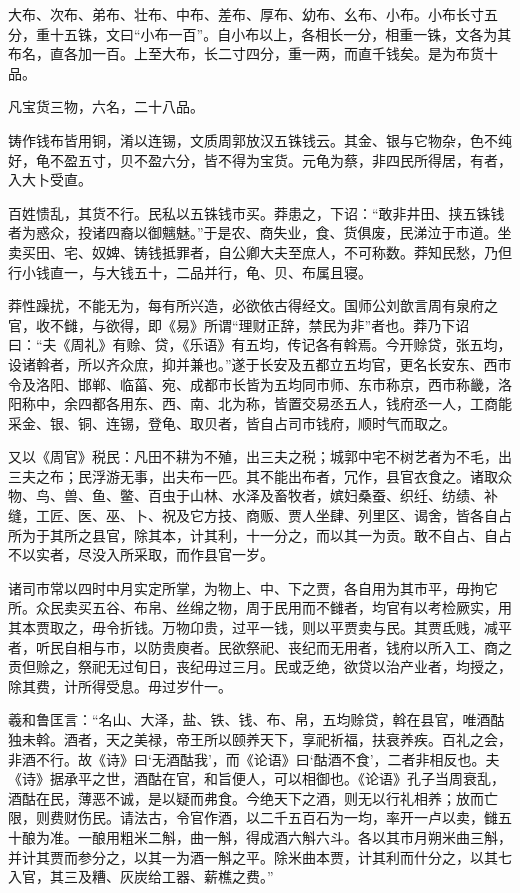 \documentclass[12pt,UTF8]{ctexbook}
\begin{document}
大布、次布、弟布、壮布、中布、差布、厚布、幼布、幺布、小布。小布长寸五分，重十五铢，文曰“小布一百”。自小布以上，各相长一分，相重一铢，文各为其布名，直各加一百。上至大布，长二寸四分，重一两，而直千钱矣。是为布货十品。



凡宝货三物，六名，二十八品。



铸作钱布皆用铜，淆以连锡，文质周郭放汉五铢钱云。其金、银与它物杂，色不纯好，龟不盈五寸，贝不盈六分，皆不得为宝货。元龟为蔡，非四民所得居，有者，入大卜受直。



百姓愦乱，其货不行。民私以五铢钱市买。莽患之，下诏：“敢非井田、挟五铢钱者为惑众，投诸四裔以御魑魅。”于是农、商失业，食、货俱废，民涕泣于市道。坐卖买田、宅、奴婢、铸钱抵罪者，自公卿大夫至庶人，不可称数。莽知民愁，乃但行小钱直一，与大钱五十，二品并行，龟、贝、布属且寝。



莽性躁扰，不能无为，每有所兴造，必欲依古得经文。国师公刘歆言周有泉府之官，收不雠，与欲得，即《易》所谓“理财正辞，禁民为非”者也。莽乃下诏曰：“夫《周礼》有赊、贷，《乐语》有五均，传记各有斡焉。今开赊贷，张五均，设诸斡者，所以齐众庶，抑并兼也。”遂于长安及五都立五均官，更名长安东、西市令及洛阳、邯郸、临菑、宛、成都市长皆为五均同市师、东市称京，西市称畿，洛阳称中，余四都各用东、西、南、北为称，皆置交易丞五人，钱府丞一人，工商能采金、银、铜、连锡，登龟、取贝者，皆自占司市钱府，顺时气而取之。



又以《周官》税民：凡田不耕为不殖，出三夫之税；城郭中宅不树艺者为不毛，出三夫之布；民浮游无事，出夫布一匹。其不能出布者，冗作，县官衣食之。诸取众物、鸟、兽、鱼、鳖、百虫于山林、水泽及畜牧者，嫔妇桑蚕、织纴、纺绩、补缝，工匠、医、巫、卜、祝及它方技、商贩、贾人坐肆、列里区、谒舍，皆各自占所为于其所之县官，除其本，计其利，十一分之，而以其一为贡。敢不自占、自占不以实者，尽没入所采取，而作县官一岁。



诸司市常以四时中月实定所掌，为物上、中、下之贾，各自用为其市平，毋拘它所。众民卖买五谷、布帛、丝绵之物，周于民用而不雠者，均官有以考检厥实，用其本贾取之，毋令折钱。万物卬贵，过平一钱，则以平贾卖与民。其贾氐贱，减平者，听民自相与市，以防贵庾者。民欲祭祀、丧纪而无用者，钱府以所入工、商之贡但赊之，祭祀无过旬日，丧纪毋过三月。民或乏绝，欲贷以治产业者，均授之，除其费，计所得受息。毋过岁什一。



羲和鲁匡言：“名山、大泽，盐、铁、钱、布、帛，五均赊贷，斡在县官，唯酒酤独未斡。酒者，天之美禄，帝王所以颐养天下，享祀祈福，扶衰养疾。百礼之会，非酒不行。故《诗》曰‘无酒酤我’，而《论语》曰‘酤酒不食’，二者非相反也。夫《诗》据承平之世，酒酤在官，和旨便人，可以相御也。《论语》孔子当周衰乱，酒酤在民，薄恶不诚，是以疑而弗食。今绝天下之酒，则无以行礼相养；放而亡限，则费财伤民。请法古，令官作酒，以二千五百石为一均，率开一卢以卖，雠五十酿为准。一酿用粗米二斛，曲一斛，得成酒六斛六斗。各以其市月朔米曲三斛，并计其贾而参分之，以其一为酒一斛之平。除米曲本贾，计其利而什分之，以其七入官，其三及糟、灰炭给工器、薪樵之费。”
\end{document}
